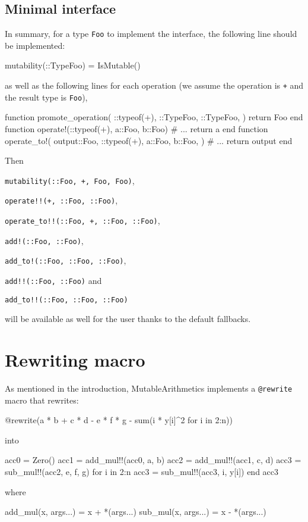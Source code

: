 \documentclass{juliacon}
\newcommand{\ma}{MutableArithmetics}
\begin{document}
\subsection{Minimal interface}
In summary, for a type \lstinline|Foo| to implement the interface,
the following line should be implemented:
\begin{jllisting}
mutability(::Type{Foo}) = IsMutable()
\end{jllisting}
as well as the following lines for each operation
(we assume the operation is \lstinline|+|
and the result type is \lstinline|Foo|),
\begin{jllisting}
function promote_operation(
    ::typeof(+),
    ::Type{Foo},
    ::Type{Foo},
)
    return Foo
end
function operate!(::typeof(+), a::Foo, b::Foo)
    # ...
    return a
end
function operate_to!(
    output::Foo,
    ::typeof(+),
    a::Foo,
    b::Foo,
)
    # ...
    return output
end
\end{jllisting}
Then
\begin{unnumlist}
  \item \lstinline|mutability(::Foo, +, Foo, Foo)|,
  \item \lstinline|operate!!(+, ::Foo, ::Foo)|,
  \item \lstinline|operate_to!!(::Foo, +, ::Foo, ::Foo)|,
  \item \lstinline|add!(::Foo, ::Foo)|,
  \item \lstinline|add_to!(::Foo, ::Foo, ::Foo)|,
  \item \lstinline|add!!(::Foo, ::Foo)| and
  \item \lstinline|add_to!!(::Foo, ::Foo, ::Foo)|
\end{unnumlist}
will be available as well for the user thanks to the default fallbacks.

\section{Rewriting macro}

As mentioned in the introduction, \ma{} implements a \lstinline|@rewrite| macro that rewrites:
\begin{jllisting}
@rewrite(a * b + c * d - e * f * g - sum(i * y[i]^2 for i in 2:n))
\end{jllisting}
into
\begin{jllisting}
acc0 = Zero()
acc1 = add_mul!!(acc0, a, b)
acc2 = add_mul!!(acc1, c, d)
acc3 = sub_mul!!(acc2, e, f, g)
for i in 2:n
  acc3 = sub_mul!!(acc3, i, y[i])
end
acc3
\end{jllisting}
where
\begin{jllisting}
add_mul(x, args...) = x + *(args...)
sub_mul(x, args...) = x - *(args...)
\end{jllisting}
\end{document}
